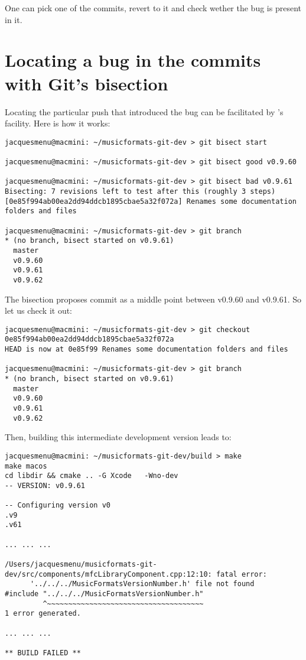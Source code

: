 One can pick one of the commits, revert to it and check wether the bug is present in it.


\section{Locating a bug in the commits with Git's bisection}

Locating the particular push that introduced the bug can be facilitated by \git 's  facility.
Here is how it works:
\begin{lstlisting}[language=Terminal]
jacquesmenu@macmini: ~/musicformats-git-dev > git bisect start

jacquesmenu@macmini: ~/musicformats-git-dev > git bisect good v0.9.60

jacquesmenu@macmini: ~/musicformats-git-dev > git bisect bad v0.9.61
Bisecting: 7 revisions left to test after this (roughly 3 steps)
[0e85f994ab00ea2dd94ddcb1895cbae5a32f072a] Renames some documentation folders and files

jacquesmenu@macmini: ~/musicformats-git-dev > git branch
* (no branch, bisect started on v0.9.61)
  master
  v0.9.60
  v0.9.61
  v0.9.62
\end{lstlisting}

The bisection proposes commit  as a middle point between v0.9.60 and v0.9.61.
So let us check it out:
\begin{lstlisting}[language=Terminal]
jacquesmenu@macmini: ~/musicformats-git-dev > git checkout 0e85f994ab00ea2dd94ddcb1895cbae5a32f072a
HEAD is now at 0e85f99 Renames some documentation folders and files

jacquesmenu@macmini: ~/musicformats-git-dev > git branch
* (no branch, bisect started on v0.9.61)
  master
  v0.9.60
  v0.9.61
  v0.9.62
\end{lstlisting}

Then, building this intermediate development version leads to:
\begin{lstlisting}[language=Terminal]
jacquesmenu@macmini: ~/musicformats-git-dev/build > make
make macos
cd libdir && cmake .. -G Xcode   -Wno-dev
-- VERSION: v0.9.61

-- Configuring version v0
.v9
.v61

... ... ...

/Users/jacquesmenu/musicformats-git-dev/src/components/mfcLibraryComponent.cpp:12:10: fatal error:
      '../../../MusicFormatsVersionNumber.h' file not found
#include "../../../MusicFormatsVersionNumber.h"
         ^~~~~~~~~~~~~~~~~~~~~~~~~~~~~~~~~~~~~~
1 error generated.

... ... ...

** BUILD FAILED **
\end{lstlisting}

